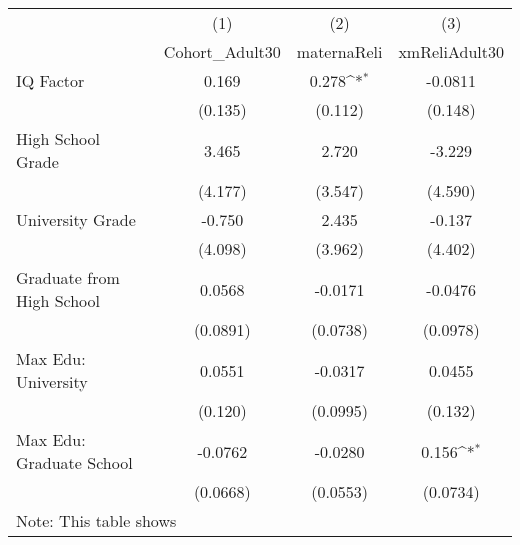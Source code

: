 {
\def\sym#1{\ifmmode^{#1}\else\(^{#1}\)\fi}
\begin{tabular}{l*{3}{c}}
\hline\hline
            &\multicolumn{1}{c}{(1)}&\multicolumn{1}{c}{(2)}&\multicolumn{1}{c}{(3)}\\
            &\multicolumn{1}{c}{Cohort\_Adult30}&\multicolumn{1}{c}{maternaReli}&\multicolumn{1}{c}{xmReliAdult30}\\
\hline
IQ Factor   &       0.169         &       0.278\sym{*}  &     -0.0811         \\
            &     (0.135)         &     (0.112)         &     (0.148)         \\
[1em]
High School Grade&       3.465         &       2.720         &      -3.229         \\
            &     (4.177)         &     (3.547)         &     (4.590)         \\
[1em]
University Grade&      -0.750         &       2.435         &      -0.137         \\
            &     (4.098)         &     (3.962)         &     (4.402)         \\
[1em]
Graduate from High School&      0.0568         &     -0.0171         &     -0.0476         \\
            &    (0.0891)         &    (0.0738)         &    (0.0978)         \\
[1em]
Max Edu: University&      0.0551         &     -0.0317         &      0.0455         \\
            &     (0.120)         &    (0.0995)         &     (0.132)         \\
[1em]
Max Edu: Graduate School&     -0.0762         &     -0.0280         &       0.156\sym{*}  \\
            &    (0.0668)         &    (0.0553)         &    (0.0734)         \\
\hline\hline
\multicolumn{4}{l}{\footnotesize Note: This table shows}\\
\end{tabular}
}
